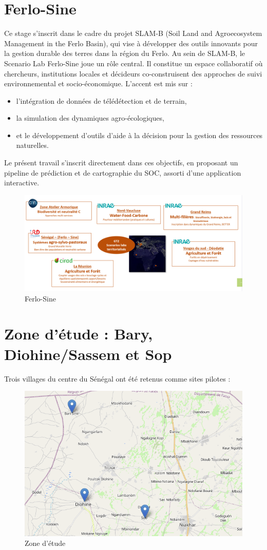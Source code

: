 \documentclass[12pt,a4paper,oneside]{report}
\begin{document}
\newpage

\section{Ferlo-Sine}
Ce stage s’inscrit dans le cadre du projet SLAM-B (Soil Land and Agroecosystem Management in the Ferlo Basin), qui vise à développer des outils innovants pour la gestion durable des terres dans la région du Ferlo.
\newline
Au sein de SLAM-B, le Scenario Lab Ferlo-Sine joue un rôle central. Il constitue un espace collaboratif où chercheurs, institutions locales et décideurs co-construisent des approches de suivi environnemental et socio-économique. L’accent est mis sur :
\begin{itemize}
  \item l’intégration de données de télédétection et de terrain,

\item la simulation des dynamiques agro-écologiques,

\item et le développement d’outils d’aide à la décision pour la gestion des ressources naturelles.
\end{itemize}
Le présent travail s’inscrit directement dans ces objectifs, en proposant un pipeline de prédiction et de cartographie du SOC, assorti d’une application interactive.

\begin{figure}[h]
    \centering
    \includegraphics[width=0.7\linewidth]{images/ferlo_sine.png}
    \caption{Ferlo-Sine}
    \label{fig:ferlo_sine}
\end{figure}

\newpage
\section{Zone d’étude : Bary, Diohine/Sassem et Sop}
Trois villages du centre du Sénégal ont été retenus comme sites pilotes :
\begin{figure}[h]
    \centering
    \includegraphics[width=0.5\linewidth]{images/bary_sop_dohien_1.png}
    \caption{Zone d'étude}
    \label{fig:zone_etude}
\end{figure}
\end{document}
